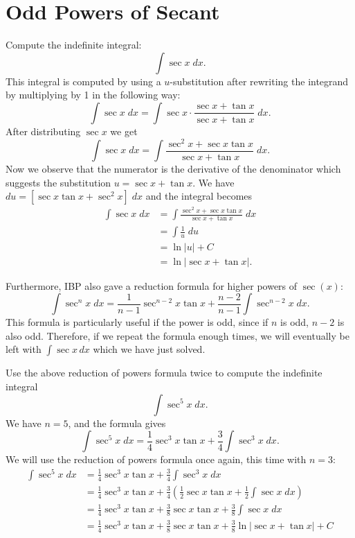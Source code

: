 \documentclass[handout]{ximera}
\begin{document}
\section{Odd Powers of Secant}
\begin{example}
Compute the indefinite integral:
\[
\int \sec x \; dx.
\]
This integral is computed by using a $u$-substitution after rewriting the integrand
by multiplying by 1 in the following way:
\[
\int \sec x \; dx = \int \sec x \cdot \frac{\sec x + \tan x}{\sec x + \tan x} \; dx.
\]
After distributing $\sec x$ we get
\[
\int \sec x \; dx = \int \frac{\sec^2 x + \sec x\tan x}{\sec x + \tan x} \; dx.
\]
Now we observe that the numerator is the derivative of the denominator which suggests the substitution
$u = \sec x + \tan x$. We have $du = [ \sec x\tan x + \sec^2 x] \; dx$ and the integral becomes
\begin{align*}
\int \sec x \; dx &= \int \frac{\sec^2 x + \sec x\tan x}{\sec x + \tan x} \; dx\\
&= \int \frac{1}{u} \; du\\
&= \ln|u| + C\\
&= \ln|\sec x + \tan x|.
\end{align*}

\end{example}

Furthermore, IBP also gave a reduction formula for higher powers of $\sec(x)$:
\[
\int \sec^n x \; dx =  \frac{1}{n-1}\sec^{n-2} x\tan x + \frac{n-2}{n-1}\int \sec^{n-2} x \; dx. 
\]
This formula is particularly useful if
the power is odd, since if $n$ is odd, $n-2$ is also odd.  Therefore, if we repeat the formula enough times, 
we will eventually be left with $\int \sec x \, dx$
which we have just solved.

\begin{example}
Use the above reduction of powers formula twice to compute the indefinite integral
\[
\int \sec^5 x \; dx.
\]
We have $n =5$, and the formula gives
\[
\int \sec^5 x \; dx = \frac14 \sec^3 x\tan x + \frac34 \int \sec^3 x \; dx.
\]
We will use the reduction of powers formula once again, this time with $n=3$:
\begin{align*}
\int \sec^5 x\; dx &= \frac14 \sec^3 x\tan x + \frac34 \int \sec^3 x \; dx\\
&= \frac14 \sec^3 x\tan x + \frac34\left(\frac12\sec x\tan x + \frac12\int \sec x \; dx\right)\\
&=\frac14 \sec^3 x\tan x + \frac38\sec x\tan x + \frac38 \int \sec x \; dx \\
&=\frac14 \sec^3 x\tan x + \frac38\sec x\tan x + \frac38\ln|\sec x + \tan x| + C
\end{align*}
\end{example}
\end{document}
